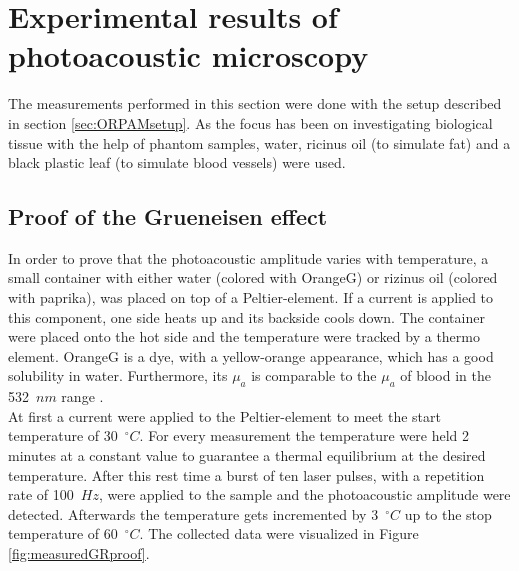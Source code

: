 \section{Experimental results of photoacoustic microscopy}
The measurements performed in this section were done with the setup described in section \ref{sec:ORPAMsetup}. As the focus has been on investigating biological tissue with the help of phantom samples, water, ricinus oil (to simulate fat) and a black plastic leaf (to simulate blood vessels) were used.

\subsection{Proof of the Grueneisen effect}
\label{sec:GRpoof}
In order to prove that the photoacoustic amplitude varies with temperature, a small container with either water (colored with OrangeG) or rizinus oil (colored with paprika), was placed on top of a Peltier-element. If a current is applied to this component, one side heats up and its backside cools down. The container were placed onto the hot side and the temperature were tracked by a thermo element. OrangeG is a dye, with a yellow-orange appearance, which has a good solubility in water. Furthermore, its $\mu_a$ is comparable to the $\mu_a$ of blood in the 532~$nm$ range \cite{data:OrangeG}.\\
At first a current were applied to the Peltier-element to meet the start temperature of 30~$^\circ C$. For every measurement the temperature were held 2 minutes at a constant value to guarantee a thermal equilibrium at the desired temperature. After this rest time a burst of ten laser pulses, with a repetition rate of 100~$Hz$, were applied to the sample and the photoacoustic amplitude were detected. Afterwards the temperature gets incremented by 3~$^\circ C$ up to the stop temperature of 60~$^\circ C$. The collected data were visualized in Figure \ref{fig:measuredGRproof}.
 
